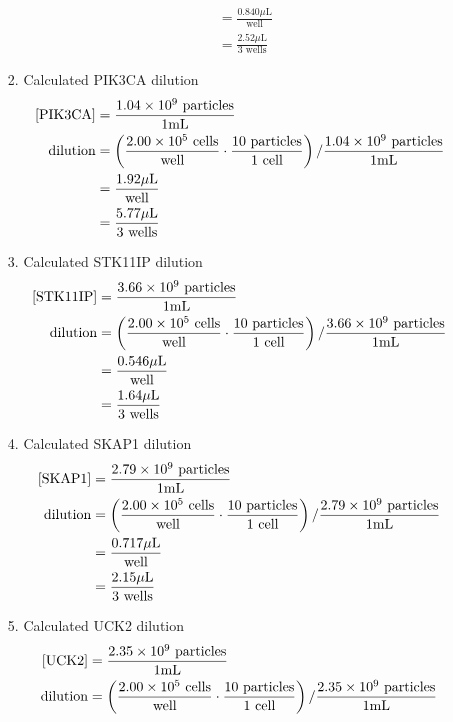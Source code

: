 \begin{enumerate}
\begin{enumerate}
\begin{enumerate}
\begin{align*}
							&= \frac{0.840\mu\text{L}}{\text{well}}\\
							&= \frac{2.52\mu\text{L}}{3\text{ wells}}
						\end{align*}
					\item Calculated PIK3CA dilution
							\begin{align*}
							\text{[PIK3CA]} &= \frac{1.04\times 10^{9}\text{ particles}}{1\text{mL}}\\
							\text{dilution}&= \left(\frac{2.00\times 10^{5}\text{ cells}}{\text{well}}\cdot \frac{10\text{ particles}}{1\text{ cell}}\right)/\frac{1.04\times 10^{9}\text{ particles}}{1\text{mL}}\\
							&= \frac{1.92\mu\text{L}}{\text{well}}\\
							&= \frac{5.77\mu\text{L}}{3\text{ wells}}
						\end{align*}
					\item Calculated STK11IP dilution
							\begin{align*}
							\text{[STK11IP]} &= \frac{3.66\times 10^{9}\text{ particles}}{1\text{mL}}\\
							\text{dilution}&= \left(\frac{2.00\times 10^{5}\text{ cells}}{\text{well}}\cdot \frac{10\text{ particles}}{1\text{ cell}}\right)/\frac{3.66\times 10^{9}\text{ particles}}{1\text{mL}}\\
							&= \frac{0.546\mu\text{L}}{\text{well}}\\
							&= \frac{1.64\mu\text{L}}{3\text{ wells}}
						\end{align*}
					\item Calculated SKAP1 dilution
							\begin{align*}
							\text{[SKAP1]} &= \frac{2.79\times 10^{9}\text{ particles}}{1\text{mL}}\\
							\text{dilution}&= \left(\frac{2.00\times 10^{5}\text{ cells}}{\text{well}}\cdot \frac{10\text{ particles}}{1\text{ cell}}\right)/\frac{2.79\times 10^{9}\text{ particles}}{1\text{mL}}\\
							&= \frac{0.717\mu\text{L}}{\text{well}}\\
							&= \frac{2.15\mu\text{L}}{3\text{ wells}}
						\end{align*}
					\item Calculated UCK2 dilution
							\begin{align*}
							\text{[UCK2]} &= \frac{2.35\e{9}\text{ particles}}{1\text{mL}}\\
							\text{dilution}&= \left(\frac{2.00\e{5}\text{ cells}}{\text{well}}\cdot \frac{10\text{ particles}}{1\text{ cell}}\right)/\frac{2.35\e{9}\text{ particles}}{1\text{mL}}\\

\end{align*}
\end{enumerate}
\end{enumerate}
\end{enumerate}
